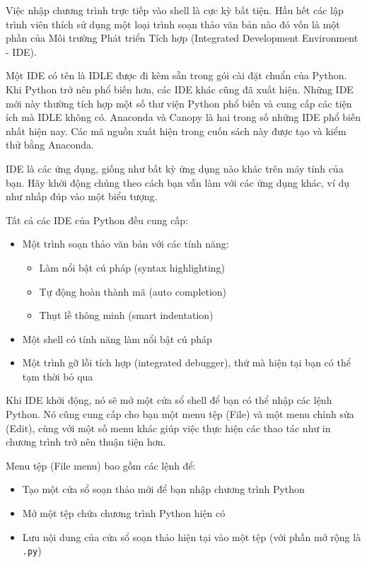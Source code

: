 \noindent \indent Việc nhập chương trình trực tiếp vào shell là cực kỳ bất tiện. Hầu hết các lập trình viên thích sử dụng một loại trình soạn thảo văn bản nào đó vốn là một phần của Môi trường Phát triển Tích hợp (Integrated Development Environment - IDE).

Một IDE có tên là IDLE được đi kèm sẵn trong gói cài đặt chuẩn của Python. Khi Python trở nên phổ biến hơn, các IDE khác cũng đã xuất hiện. Những IDE mới này thường tích hợp một số thư viện Python phổ biến và cung cấp các tiện ích mà IDLE không có. Anaconda và Canopy là hai trong số những IDE phổ biến nhất hiện nay. Các mã nguồn xuất hiện trong cuốn sách này được tạo và kiểm thử bằng Anaconda.

IDE là các ứng dụng, giống như bất kỳ ứng dụng nào khác trên máy tính của bạn. Hãy khởi động chúng theo cách bạn vẫn làm với các ứng dụng khác, ví dụ như nhấp đúp vào một biểu tượng.

Tất cả các IDE của Python đều cung cấp:
\begin{itemize}
    \item Một trình soạn thảo văn bản với các tính năng:
    \begin{itemize}
        \item Làm nổi bật cú pháp (syntax highlighting)
        \item Tự động hoàn thành mã (auto completion)
        \item Thụt lề thông minh (smart indentation)
    \end{itemize}
    
    \item Một shell có tính năng làm nổi bật cú pháp
    
    \item Một trình gỡ lỗi tích hợp (integrated debugger), thứ mà hiện tại bạn có thể tạm thời bỏ qua
\end{itemize}

Khi IDE khởi động, nó sẽ mở một cửa sổ shell để bạn có thể nhập các lệnh Python. Nó cũng cung cấp cho bạn một menu tệp (File) và một menu chỉnh sửa (Edit), cùng với một số menu khác giúp việc thực hiện các thao tác như in chương trình trở nên thuận tiện hơn.

Menu tệp (File menu) bao gồm các lệnh để:
\begin{itemize}
    \item Tạo một cửa sổ soạn thảo mới để bạn nhập chương trình Python
    \item Mở một tệp chứa chương trình Python hiện có
    \item Lưu nội dung của cửa sổ soạn thảo hiện tại vào một tệp (với phần mở rộng là \texttt{.py})
\end{itemize}

